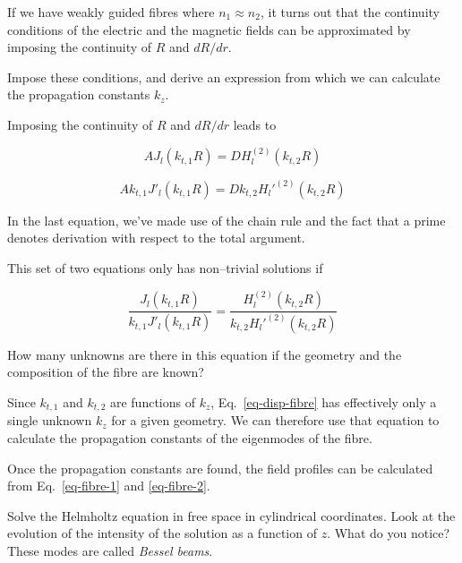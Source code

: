If we have weakly guided fibres where $n_1 \approx n_2$, it turns out that the continuity conditions of the electric and the magnetic fields can be approximated by imposing the continuity of $R$ and $d R / d r$.

\begin{cue}
Impose these conditions, and derive an expression from which we can calculate the propagation constants $k_z$. 
\end{cue}

Imposing the continuity of $R$ and $d R / dr$ leads to

\begin{equation}
A J_l\left(k_{t,1}R\right) = D H_l^{(2)}\left(k_{t,2}R\right)
\end{equation} 

\begin{equation}
A k_{t,1} J'_l\left(k_{t,1}R\right) = D k_{t,2} H_l'^{(2)}\left(k_{t,2}R\right)
\end{equation} 

In the last equation, we've made use of the chain rule and the fact that a prime denotes derivation with respect to the total argument.

This set of two equations only has non--trivial solutions if

\begin{equation}
\frac{J_l\left(k_{t,1}R\right)}{k_{t,1} J'_l\left(k_{t,1}R\right)} = \frac{H_l^{(2)}\left(k_{t,2}R\right)}{k_{t,2} H_l'^{(2)}\left(k_{t,2}R\right)} \label{eq-disp-fibre}
\end{equation}

\begin{cue}
How many unknowns are there in this equation if the geometry and the composition of the fibre are known?  
\end{cue}

Since $k_{t,1}$ and $k_{t,2}$ are functions of $k_z$, Eq.~\ref{eq-disp-fibre} has effectively only a single unknown $k_z$ for a given geometry. We can therefore use that equation to calculate the propagation constants of the eigenmodes of the fibre.

Once the propagation constants are found, the field profiles can be calculated from Eq.~\ref{eq-fibre-1} and \ref{eq-fibre-2}.


\begin{exer}
Solve the Helmholtz equation in free space in cylindrical coordinates. Look at the evolution of the intensity of the solution as a function of $z$. What do you notice? These modes are called \emph{Bessel beams}.
\end{exer}



